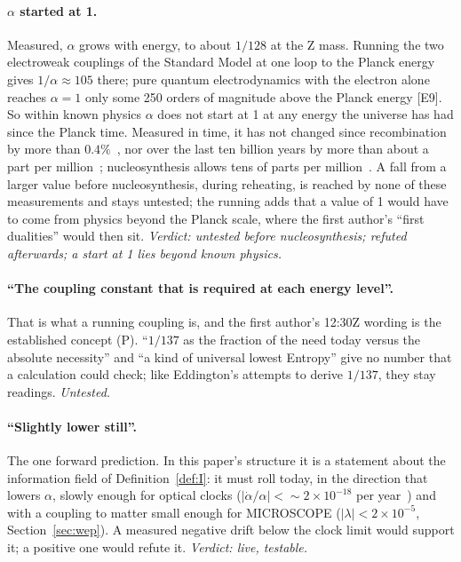 \documentclass[11pt,a4paper]{article}
\theoremstyle{definition}
\theoremstyle{remark}
\newcommand{\chk}[1]{\textsf{[#1]}}
\newcommand{\tagP}{\textsf{(P)}}
\begin{document}
\paragraph{$\alpha$ started at 1.} Measured, $\alpha$ grows with energy, to about $1/128$ at the Z mass. Running the two electroweak couplings
of the Standard Model at one loop to the Planck energy gives $1/\alpha\approx105$ there; pure quantum electrodynamics with the electron alone
reaches $\alpha=1$ only some 250 orders of magnitude above the Planck energy \chk{E9}. So within known physics $\alpha$ does not start at 1
at any energy the universe has had since the Planck time. Measured in time, it has not changed since recombination by more than
$0.4\%$~\cite{planckxxiv}, nor over the last ten billion years by more than about a part per million~\cite{espresso}; nucleosynthesis allows
tens of parts per million~\cite{bbn}. A fall from a larger value before nucleosynthesis, during reheating, is reached by none of these
measurements and stays untested; the running adds that a value of 1 would have to come from physics beyond the Planck scale, where the first author's ``first dualities'' would
then sit. \emph{Verdict: untested before nucleosynthesis; refuted afterwards; a start at 1 lies beyond known physics.}

\paragraph{``The coupling constant that is required at each energy level''.} That is what a running coupling is, and the first author's
12:30Z wording is the established concept \tagP. ``$1/137$ as the fraction of the need today versus the absolute necessity'' and ``a kind of
universal lowest Entropy'' give no number that a calculation could check; like Eddington's attempts to derive $1/137$, they stay readings.
\emph{Untested.}

\paragraph{``Slightly lower still''.} The one forward prediction. In this paper's structure it is a statement about the information field
of Definition~\ref{def:I}: it must roll today, in the direction that lowers $\alpha$, slowly enough for optical clocks
($|\dot\alpha/\alpha|<\sim2\times10^{-18}$ per year~\cite{lange}) and with a coupling to matter small enough for MICROSCOPE
($|\lambda|<2\times10^{-5}$, Section~\ref{sec:wep}). A measured negative drift below the clock limit would support it; a positive one
would refute it. \emph{Verdict: live, testable.}
\end{document}
